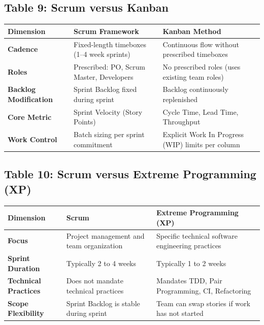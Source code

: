\subsection*{Table 9: Scrum versus Kanban}
\begin{center}
\small
\begin{tabularx}{\textwidth}{lXX}
\toprule
\textbf{Dimension} & \textbf{Scrum Framework} & \textbf{Kanban Method} \\
\midrule
\textbf{Cadence} & Fixed-length timeboxes (1--4 week sprints) & Continuous flow without prescribed timeboxes \\
\textbf{Roles} & Prescribed: PO, Scrum Master, Developers & No prescribed roles (uses existing team roles) \\
\textbf{Backlog Modification} & Sprint Backlog fixed during sprint & Backlog continuously replenished \\
\textbf{Core Metric} & Sprint Velocity (Story Points) & Cycle Time, Lead Time, Throughput \\
\textbf{Work Control} & Batch sizing per sprint commitment & Explicit Work In Progress (WIP) limits per column \\
\bottomrule
\end{tabularx}
\end{center}

\subsection*{Table 10: Scrum versus Extreme Programming (XP)}
\begin{center}
\small
\begin{tabularx}{\textwidth}{lXX}
\toprule
\textbf{Dimension} & \textbf{Scrum} & \textbf{Extreme Programming (XP)} \\
\midrule
\textbf{Focus} & Project management and team organization & Specific technical software engineering practices \\
\textbf{Sprint Duration} & Typically 2 to 4 weeks & Typically 1 to 2 weeks \\
\textbf{Technical Practices} & Does not mandate technical practices & Mandates TDD, Pair Programming, CI, Refactoring \\
\textbf{Scope Flexibility} & Sprint Backlog is stable during sprint & Team can swap stories if work has not started \\
\bottomrule
\end{tabularx}
\end{center}

